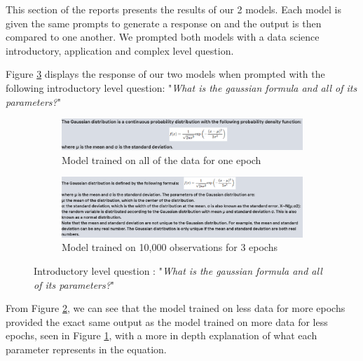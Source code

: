\documentclass[10pt]{article}
\begin{document}
This section of the reports presents the results of our 2 models. Each model is given the
same prompts to generate a response on and the output is then compared to one another.
We prompted both models with a data science introductory, application and complex level question.

Figure \ref{fig: Q1} displays the response of our two models when prompted with the following introductory
level question: "\textit{What is the gaussian formula and all of its parameters?}"
\begin{figure}[H]
    \centering
    \begin{subfigure}[b]{0.45\textwidth}
        \centering
        \includegraphics[width=\textwidth]{Images/1EpochQ1.png}
        \caption{Model trained on all of the data for one epoch}
        \label{fig: Q1_Model1}
    \end{subfigure}
    \hfill
    \begin{subfigure}[b]{0.5\textwidth}
        \centering
        \includegraphics[width=\textwidth]{Images/10kQ1.png}
        \caption{Model trained on 10,000 observations for 3 epochs}
        \label{fig: Q1_Model2}
    \end{subfigure}
    \caption{Introductory level question : "\textit{What is the gaussian formula and all of its parameters?}"}
    \label{fig: Q1}
\end{figure}
From Figure \ref{fig: Q1_Model2}, we can see that the model trained on less data for more epochs
provided the exact same output as the model trained on more data for less epochs, seen
in Figure \ref{fig: Q1_Model1}, with a more in depth explanation of what each parameter
represents in the equation.
\end{document}
